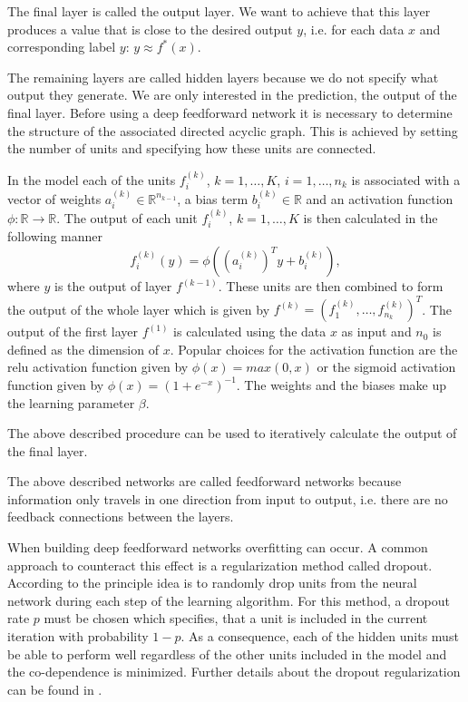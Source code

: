 \documentclass[12pt, a4paper]{scrartcl}
\theoremstyle{definition}
\theoremstyle{plain}
\numberwithin{equation}{section}
\numberwithin{figure}{section}
\numberwithin{table}{section}
\begin{document}
	The final layer is called the output layer.
	We want to achieve that this layer produces a value that is close to the desired output $y$, i.e. for each data $x$ and corresponding label $y$: $y \approx f^*(x)$.
	
	The remaining layers are called hidden layers because we do not specify what output they generate.
	We are only interested in the prediction, the output of the final layer.
	Before using a deep feedforward network it is necessary to determine the structure of the associated directed acyclic graph.
	This is achieved by setting the number of units and specifying how these units are connected.
	
	In the model each of the units $f^{(k)}_i$, $k=1,\dots,K$, $i = 1,\dots,n_{k}$ is associated with a vector of weights $a^{(k)}_i \in \mathbb{R}^{n_{k-1}}$, a bias term $b^{(k)}_i\in \mathbb{R}$ and an activation function $\phi: \mathbb{R} \to \mathbb{R}$.
	The output of each unit $f^{(k)}_i$, $k=1,\dots,K$ is then calculated in the following manner
	\begin{equation*}
	f_i^{(k)}(y) = \phi \left(\left(a^{(k)}_i\right)^Ty + b^{(k)}_i\right),
	\end{equation*}
	where $y$ is the output of layer $f^{(k-1)}$.
	These units are then combined to form the output of the whole layer which is given by $f^{(k)} = \left(f^{(k)}_1,\dots, f^{(k)}_{n_k}\right)^T$.
	The output of the first layer $f^{(1)}$ is calculated using the data $x$ as input and $n_0$ is defined as the dimension of $x$.
	Popular choices for the activation function are the relu activation function given by $\phi(x) = max(0,x)$ or the sigmoid activation function given by $\phi(x) = (1+e^{-x})^{-1}$.
	The weights and the biases make up the learning parameter $\beta$.
	
	The above described procedure can be used to iteratively calculate the output of the final layer.
	
	
	The above described networks are called feedforward networks because information only travels in one direction from input to output, i.e. there are no feedback connections between the layers.
	
	When building deep feedforward networks overfitting can occur.
	A common approach to counteract this effect is a regularization method called dropout.
	According to \citet*{dropout} the principle idea is to randomly drop units from the neural network during each step of the learning algorithm.
	For this method, a dropout rate $p$ must be chosen which specifies, that a unit is included in the current iteration with probability $1-p$.
	As a consequence, each of the hidden units must be able to perform well regardless of the other units included in the model and the co-dependence is minimized.
	Further details about the dropout regularization can be found in \citet*{dropout}.
	
\end{document}
